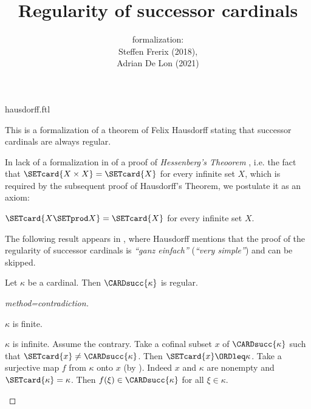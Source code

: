 \documentclass{article}
\title{Regularity of successor cardinals}
\author{\Naproche formalization:\\[0.5em]
Steffen Frerix (2018), \\
Adrian De Lon (2021)}
\date{}
\begin{document}
\begin{smodule}{hausdorff.ftl}
\maketitle


\noindent This is a formalization of a theorem of Felix Hausdorff stating that
successor cardinals are always regular.

In lack of a formalization in \Naproche of a proof of \emph{Hessenberg's
Theoorem} \cite{Hessenberg1906}, i.e. the fact that
$\SETcard{X \times X} = \SETcard{X}$ for every
infinite set $X$, which is required by the subsequent
proof of Hausdorff's Theorem, we postulate it as an axiom:

\begin{axiom*}[forthel,title=Hessenberg's Theorem,id=hessenberg]
  $\SETcard{X \SETprod X} = \SETcard{X}$ for every infinite set $X$.
\end{axiom*}

The following result appears in \cite[p.~443]{Hausdorff1908},
where Hausdorff mentions that the proof of the regularity of successor
cardinals is \textit{``ganz einfach''} (\textit{``very simple''})
and can be skipped.

\begin{forthel}
  \begin{theorem*}[title=Hausdorff]
    Let $\kappa$ be a cardinal.
    Then $\CARDsucc{\kappa}$ is regular.
  \end{theorem*}
  \begin{proof}[method=contradiction]
    \begin{case}{$\kappa$ is finite.} \end{case}

    \begin{case}{$\kappa$ is infinite.}
      Assume the contrary.
      Take a cofinal subset $x$ of $\CARDsucc{\kappa}$ such that $\SETcard{x} \neq \CARDsucc{\kappa}$.
      Then $\SETcard{x} \ORDleq \kappa$.
      Take a surjective map $f$ from $\kappa$ onto $x$ (by ).
      Indeed $x$ and $\kappa$ are nonempty and $\SETcard{\kappa} = \kappa$.
      Then $f(\xi) \in \CARDsucc{\kappa}$ for all $\xi \in \kappa$.
  

\end{case}
\end{proof}
\end{forthel}
\end{smodule}
\end{document}
